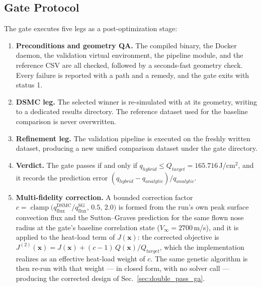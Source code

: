 \subsection{Gate Protocol}
The gate executes five legs as a post-optimization stage:
\begin{enumerate}
    \item \textbf{Preconditions and geometry QA.} The compiled binary, the Docker daemon, the validation virtual environment, the pipeline module, and the reference CSV are all checked, followed by a seconds-fast \texttt{} geometry check. Every failure is reported with a path and a remedy, and the gate exits with status 1.
    \item \textbf{DSMC leg.} The selected winner is re-simulated with \texttt{} at its geometry, writing to a dedicated results directory. The reference dataset used for the baseline comparison is never overwritten.
    \item \textbf{Refinement leg.} The validation pipeline is executed on the freshly written dataset, producing a new unified comparison dataset under the gate directory.
    \item \textbf{Verdict.} The gate passes if and only if $q_{hybrid} \leq Q_{target} = 165.716$\,J/cm$^2$, and it records the prediction error $(q_{hybrid} - q_{analytic})/q_{analytic}$.
    \item \textbf{Multi-fidelity correction.} A bounded correction factor $c = \operatorname{clamp}\bigl(q^{\mathrm{DSMC}}_{\mathrm{flux}}/\allowbreak q^{\mathrm{SG}}_{\mathrm{flux}},\,\allowbreak 0.5,\,\allowbreak 2.0\bigr)$ is formed from the run's own peak surface convection flux and the Sutton--Graves prediction for the same flown nose radius at the gate's baseline correlation
state ($V_\infty = 2700$\,m/s), and it is applied to the heat-load term of $J(\mathbf{x})$: the corrected objective is $J^{(2)}(\mathbf{x}) = J(\mathbf{x}) + (c-1)\,Q(\mathbf{x})/Q_{target}$, which the implementation realizes as an effective heat-load weight of $c$. The same genetic algorithm is then re-run with that weight --- in closed form, with no solver call --- producing the corrected design of Sec.~\ref{sec:double_pass_ga}.
\end{enumerate}

